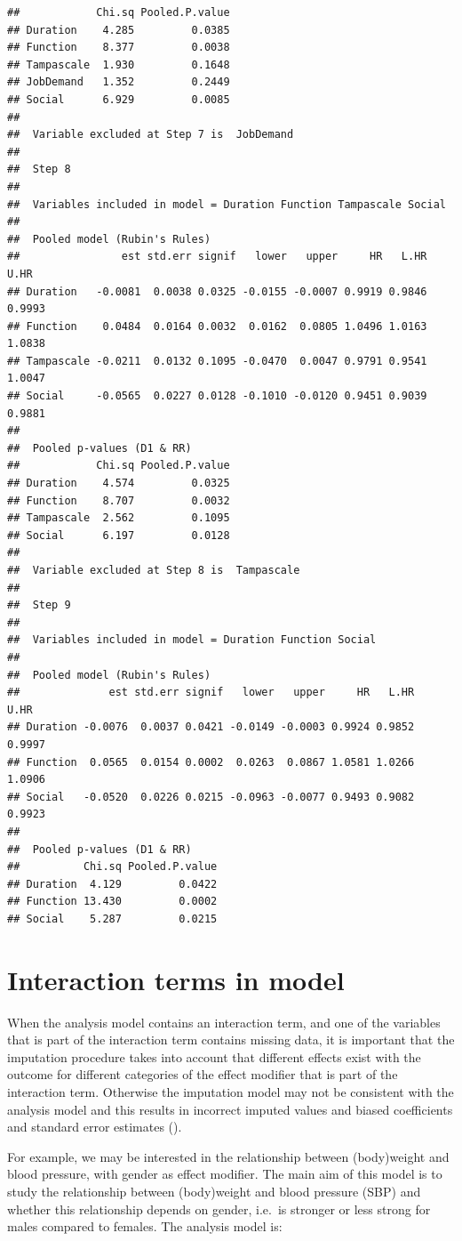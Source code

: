 \documentclass[]{book}
\begin{document}
\begin{verbatim}
##            Chi.sq Pooled.P.value
## Duration    4.285         0.0385
## Function    8.377         0.0038
## Tampascale  1.930         0.1648
## JobDemand   1.352         0.2449
## Social      6.929         0.0085
## 
##  Variable excluded at Step 7 is  JobDemand 
## 
##  Step 8 
## 
##  Variables included in model = Duration Function Tampascale Social 
## 
##  Pooled model (Rubin's Rules) 
##                est std.err signif   lower   upper     HR   L.HR   U.HR
## Duration   -0.0081  0.0038 0.0325 -0.0155 -0.0007 0.9919 0.9846 0.9993
## Function    0.0484  0.0164 0.0032  0.0162  0.0805 1.0496 1.0163 1.0838
## Tampascale -0.0211  0.0132 0.1095 -0.0470  0.0047 0.9791 0.9541 1.0047
## Social     -0.0565  0.0227 0.0128 -0.1010 -0.0120 0.9451 0.9039 0.9881
## 
##  Pooled p-values (D1 & RR) 
##            Chi.sq Pooled.P.value
## Duration    4.574         0.0325
## Function    8.707         0.0032
## Tampascale  2.562         0.1095
## Social      6.197         0.0128
## 
##  Variable excluded at Step 8 is  Tampascale 
## 
##  Step 9 
## 
##  Variables included in model = Duration Function Social 
## 
##  Pooled model (Rubin's Rules) 
##              est std.err signif   lower   upper     HR   L.HR   U.HR
## Duration -0.0076  0.0037 0.0421 -0.0149 -0.0003 0.9924 0.9852 0.9997
## Function  0.0565  0.0154 0.0002  0.0263  0.0867 1.0581 1.0266 1.0906
## Social   -0.0520  0.0226 0.0215 -0.0963 -0.0077 0.9493 0.9082 0.9923
## 
##  Pooled p-values (D1 & RR) 
##          Chi.sq Pooled.P.value
## Duration  4.129         0.0422
## Function 13.430         0.0002
## Social    5.287         0.0215
\end{verbatim}

\section{Interaction terms in model}\label{interaction-terms-in-model}

When the analysis model contains an interaction term, and one of the
variables that is part of the interaction term contains missing data, it
is important that the imputation procedure takes into account that
different effects exist with the outcome for different categories of the
effect modifier that is part of the interaction term. Otherwise the
imputation model may not be consistent with the analysis model and this
results in incorrect imputed values and biased coefficients and standard
error estimates (\citet{Bartlett2015}).

For example, we may be interested in the relationship between
(body)weight and blood pressure, with gender as effect modifier. The
main aim of this model is to study the relationship between (body)weight
and blood pressure (SBP) and whether this relationship depends on
gender, i.e.~is stronger or less strong for males compared to females.
The analysis model is:
\end{document}
